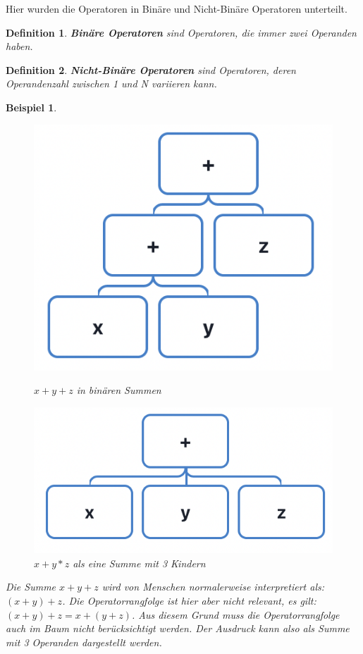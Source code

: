 \documentclass[11pt]{article}
\newtheorem{defin}{Definition}
\newtheorem{example}{Beispiel}
\begin{document}
Hier wurden die Operatoren in Binäre und Nicht-Binäre Operatoren unterteilt.
\begin{defin}
  \textbf{Binäre Operatoren} sind Operatoren, die immer zwei Operanden haben.
\end{defin} 
\begin{defin}
  \textbf{Nicht-Binäre Operatoren} sind Operatoren, deren Operandenzahl zwischen 1 und N variieren kann.
\end{defin}
\begin{example} \normalfont
  \begin{figure}[h]
  \begin{minipage}{.5\textwidth}
    \centering
    \includegraphics[scale=0.5]{trees/beispiel_non_binary_1.png}
    \caption{$x+y+z$ in binären Summen}
  \end{minipage}
  \begin{minipage}{.5\textwidth}
    \centering
    \includegraphics[scale=0.5]{trees/beispiel_non_binary_2.png}
    \caption{$x+y*z$ als eine Summe mit 3 Kindern}
  \end{minipage}
  \end{figure}
  Die Summe $x+y+z$ wird von Menschen normalerweise interpretiert als: $(x+y)+z$.
  Die Operatorrangfolge ist hier aber nicht relevant, es gilt:
  $(x+y)+z = x+(y+z)$. Aus diesem Grund muss die Operatorrangfolge auch im Baum
  nicht berücksichtigt werden. Der Ausdruck kann also als Summe mit 3 Operanden dargestellt werden.
\end{example}
\end{document}

